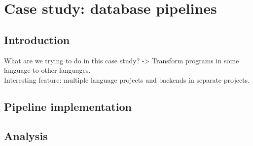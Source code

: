 \chapter{\label{chap:database}Case study: database pipelines}

\section{\label{sec:database__introduction}Introduction}
What are we trying to do in this case study?
-> Transform programs in some language to other languages.
\\
Interesting feature: multiple language projects and backends in separate projects.


\section{\label{sec:database__implementation}Pipeline implementation}


\section{\label{sec:database__analysis}Analysis}


